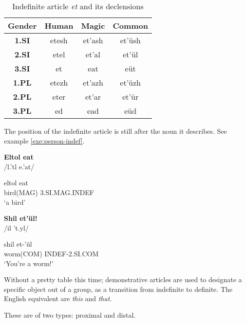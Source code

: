 \begin{table}[h]
\begin{center}\label{tab:morph-indef-pers-suff}
\begin{tabular}{|c|c|c|c|}
\hline
\textbf{Gender} & \textbf{Human} & \textbf{Magic} & \textbf{Common}\\\hline
\textbf{1.SI}                    & etesh & et’ash & et’üsh \\\hline
\textbf{2.SI}                    & etel  & et’al  & et’ül  \\\hline
\textbf{3.SI}                    & et    & eat    & eüt    \\\hline
\textbf{1.PL}                    & etezh & et’azh & et’üzh \\\hline
\textbf{2.PL}                    & eter  & et’ar  & et’ür  \\\hline
\textbf{3.PL}                    & ed    & ead    & eüd    \\\hline
\end{tabular}
\end{center}
\caption{Indefinite article \emph{et} and its declensions}
\end{table}

The position of the indefinite article is still after the noun it describes. See example
\ref{exe:person-indef}.

\begin{exe}
\ex\label{exe:person-indef}
\begin{xlist}
\ex\textbf{Eltol eat}\\
/{\ipaE}l.'t{\ipaO}l e.'at/

\gll \gls{eltol} eat\\
bird(MAG) 3.SI.MAG.INDEF\\
\trans ‘a bird’

\ex\textbf{Shil et’ül!}\\
/{\ipaS}il '{\ipaE}t.yl/

\gll {}\gls{shil} et-’ül\\
worm(COM) INDEF-2.SI.COM\\
\trans ‘You’re a worm!’
\end{xlist}
\end{exe}

Without a pretty table this time; demonstrative articles are used to designate a specific object out
of a group, as a transition from indefinite to definite. The English equivalent are \emph{this} and
\emph{that}.

These are of two types: proximal and distal.

